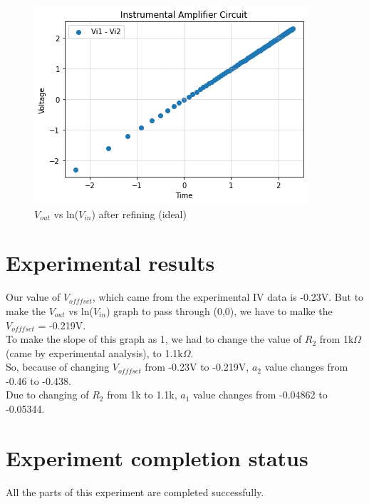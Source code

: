 \documentclass[12pt]{article}
\begin{document}
\begin{figure}[H]
\begin{center}
\includegraphics[scale = 0.8]{1.png}
\caption{$V_{out}$ vs ln($V_{in}$) after refining (ideal)}
\end{center}
\end{figure}




\section{Experimental results}
Our value of $V_{offfset}$, which came from the experimental IV data is -0.23V. But to make the $V_{out}$ vs ln($V_{in}$) graph to pass through (0,0), we have to malke the $V_{offfset}$ = -0.219V. \\
To make the slope of this graph as 1, we had to change the value of $R_2$ from 1k$\Omega $ (came by experimental analysis), to 1.1k$\Omega $. \\
So, because of changing $V_{offfset}$ from -0.23V to -0.219V, $a_2$ value changes from -0.46 to -0.438. \\
Due to changing of $R_2$ from 1k to 1.1k, $a_1$ value changes from -0.04862 to -0.05344. \\



\section{Experiment completion status}
All the parts of this experiment are completed successfully.

  
\end{document}
